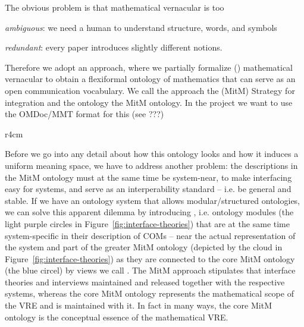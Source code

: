 The obvious problem is that mathematical vernacular is too 
\begin{inparaenum}[\em i\rm)]
\item \emph{ambiguous}: we need a human to understand structure, words, and symbols
\item \emph{redundant}: every paper introduces slightly different notions. 
\end{inparaenum}
Therefore we adopt an approach, where we partially formalize ()
mathematical vernacular to obtain a flexiformal ontology of mathematics that can serve as
an open communication vocabulary. We call the approach the 
(MitM) Strategy for integration and the ontology the MitM ontology. In the \ODK project we want to use the OMDoc/MMT
format for this (see ???)

\begin{wrapfigure}r{4cm}\vspace*{-1.5em}
  \vspace*{-.5em}
  \caption{Interface theories}\label{fig:interface-theories}\vspace*{-1em}
\end{wrapfigure}
Before we go into any detail about how this ontology looks and how it induces a uniform
meaning space, we have to address another problem: the descriptions in the MitM ontology
must at the same time be system-near, to make interfacing easy for systems, and serve as
an interperability standard -- i.e. be general and stable. If we have an ontology system
that allows modular/structured ontologies, we can solve this apparent dilemma by
introducing , i.e. ontology modules (the light purple circles
in Figure~\ref{fig:interface-theories}) that are at the same time system-specific in their
description of COMs -- near the actual representation of the system and part of the
greater MitM ontology (depicted by the cloud in Figure~\ref{fig:interface-theories}) as
they are connected to the core MitM ontology (the blue circel) by views we call
. The MitM approach
stipulates that interface theories and interviews maintained and released together with
the respective systems, whereas the core MitM ontology represents the mathematical scope
of the VRE and is maintained with it. In fact in many ways, the core MitM ontology is the
conceptual essence of the mathematical VRE. 







